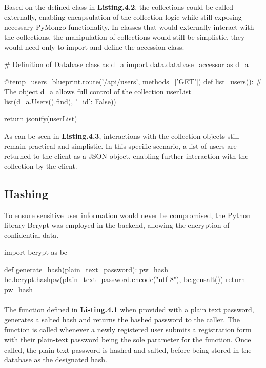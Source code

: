 Based on the defined class in \textbf{Listing.4.2}, the collections could be called externally, enabling encapsulation of the collection logic while still exposing necessary PyMongo functionality. In classes that would externally interact with the collections, the manipulation of collections would still be simplistic, they would need only to import and define the accession class. \newline

\begin{python}[caption=Interacting with Collections]
# Definition of Database class as d_a
import data.database_accessor as d_a

@temp_users_blueprint.route('/api/users', methods=['GET'])
def list_users():
    # The object d_a allows full control of the collection
    userList = list(d_a.Users().find({}, {'_id': False}))

    return jsonify(userList)
\end{python}

As can be seen in \textbf{Listing.4.3}, interactions with the collection objects still remain practical and simplistic. In this specific scenario, a list of users are returned to the client as a JSON object, enabling further interaction with the collection by the client.

\subsection{Hashing}
To ensure sensitive user information would never be compromised, the Python library Bcrypt was employed in the backend, allowing the encryption of confidential data. \newline

\begin{python}[caption=Hashing a Password with Bcrypt]
import bcrypt as bc

def generate_hash(plain_text_password):
    pw_hash = bc.bcrypt.hashpw(plain_text_password.encode("utf-8"), bc.gensalt())
    return pw_hash
\end{python}

\paragraph{}
The function defined in \textbf{Listing.4.1} when provided with a plain text password, generates a salted hash and returns the hashed password to the caller. The function is called whenever a newly registered user submits a registration form with their plain-text password being the sole parameter for the function. Once called, the plain-text password is hashed and salted, before being stored in the database as the designated hash. \newline

